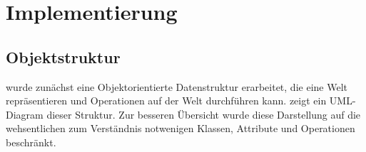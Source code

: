 \chapter{Implementierung}
\label{sec:implementation}

\TODO{}

\section{Objektstruktur}
\label{sec:implementation:structure}

\TODO{} wurde zunächst eine Objektorientierte Datenstruktur erarbeitet, die eine Welt repräsentieren und Operationen auf der Welt durchführen kann.  zeigt ein UML-Diagram dieser Struktur. Zur besseren Übersicht wurde diese Darstellung auf die wehsentlichen zum Verständnis notwenigen Klassen, Attribute und Operationen beschränkt.

